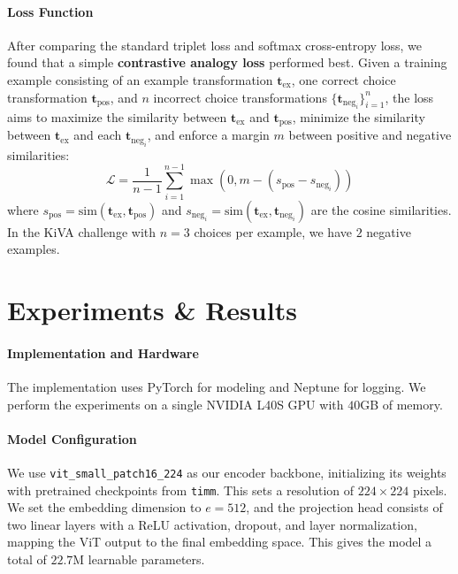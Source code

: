 \documentclass[twocolumn]{article} %
\begin{document}
\paragraph{Loss Function}
After comparing the standard triplet loss and softmax cross-entropy loss, we found that a simple \textbf{contrastive analogy loss} \cite{chopra2005learning} performed best. Given a training example consisting of an example transformation $\mathbf{t}_{\text{ex}}$, one correct choice transformation $\mathbf{t}_{\text{pos}}$, and $n$ incorrect choice transformations $\{\mathbf{t}_{\text{neg}_i}\}_{i=1}^{n}$, the loss aims to maximize the similarity between $\mathbf{t}_{\text{ex}}$ and $\mathbf{t}_{\text{pos}}$, minimize the similarity between $\mathbf{t}_{\text{ex}}$ and each $\mathbf{t}_{\text{neg}_i}$, and enforce a margin $m$ between positive and negative similarities:
\begin{equation}
\mathcal{L} = \frac{1}{n-1}\sum_{i=1}^{n-1} \max\left(0, m - \left(s_{\text{pos}} - s_{\text{neg}_i}\right)\right)
\end{equation}
where $s_{\text{pos}} = \text{sim}(\mathbf{t}_{\text{ex}}, \mathbf{t}_{\text{pos}})$ and $s_{\text{neg}_i} = \text{sim}(\mathbf{t}_{\text{ex}}, \mathbf{t}_{\text{neg}_i})$ are the cosine similarities. In the KiVA challenge with $n=3$ choices per example, we have $2$ negative examples.


\section{Experiments \& Results}

\paragraph{Implementation and Hardware} The implementation uses PyTorch for modeling and Neptune for logging. We perform the experiments on a single NVIDIA L40S GPU with $40$GB of memory.

\paragraph{Model Configuration}
We use \texttt{vit\_small\_patch16\_224} as our encoder backbone, initializing its weights with pretrained checkpoints from \texttt{timm}. This sets a resolution of $224 \times 224$ pixels. We set the embedding dimension to $e=512$, and the projection head consists of two linear layers with a ReLU activation, dropout, and layer normalization, mapping the ViT output to the final embedding space. This gives the model a total of $22.7$M learnable parameters.
\end{document}
